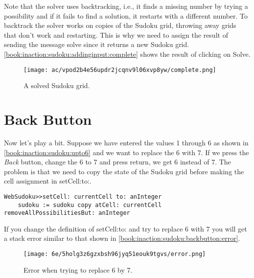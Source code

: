 \documentclass[a4paper,10pt,twoside]{book}
\newcommand{\ct}[1]{{\small\ttfamily\textup{#1}}}
\begin{document}
Note that the solver uses backtracking, i.e., it finds a missing number by trying a possibility and if it fails to find a solution, it restarts with a different number. To backtrack the solver works on copies of the Sudoku grid, throwing away grids that don't work and restarting. This is why we need to assign the result of sending the message \ct{solve} since it returns a new Sudoku grid. \autoref{book:inaction:sudoku:addinginput:complete} shows the result of clicking on Solve.

\begin{figure}[h!tbp]
	\begin{center}
		\texttt{[image: ac/vpod2b4e56updr2jcqnv9l06xvp8yw/complete.png]}
		\caption{A solved Sudoku grid.\label{book:inaction:sudoku:addinginput:complete}}
	\end{center}
\end{figure}


\section{Back Button}
\label{book:inaction:sudoku:backbutton}

Now let's play a bit. Suppose we have entered the values 1 through 6 as shown in \autoref{book:inaction:sudoku:upto6} and we want to replace the 6 with 7. If we press the \textit{Back} button, change the 6 to 7 and press return, we get 6 instead of 7. The problem is that we need to copy the state of the Sudoku grid before making the cell assignment in \ct{setCell:to:}.

\begin{lstlisting}
WebSudoku>>setCell: currentCell to: anInteger
    sudoku := sudoku copy atCell: currentCell removeAllPossibilitiesBut: anInteger
\end{lstlisting}

If you change the definition of \ct{setCell:to:} and try to replace 6 with 7 you will get a stack error similar to that shown in \autoref{book:inaction:sudoku:backbutton:error}.

\begin{figure}[h!tbp]
	\begin{center}
		\texttt{[image: 6e/5holg3z6gzxbsh96jyq51eouk9tgvs/error.png]}
		\caption{Error when trying to replace 6 by 7.\label{book:inaction:sudoku:backbutton:error}}
	\end{center}
\end{figure}
\end{document}

